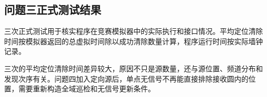 \subsection{问题三正式测试结果}

三次正式测试用于核实程序在竞赛模拟器中的实际执行和接口情况。平均定位清除时间按模拟器返回的总虚拟时间除以成功清除数量计算，程序运行时间按实际墙钟记录。

\begin{table}[H]
  \centering
  \caption{问题三三次正式测试结果}
  \label{tab:p3-official}
\end{table}

三次的平均定位清除时间差异较大，原因不只是源数量，还与源位置、频道分布和发现次序有关。问题四加入定向源后，单点无信号不再能直接排除接收圆内的位置，需要重新构造全域巡检和无信号更新条件。
